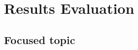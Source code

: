 \documentclass{report}
\begin{document}





\chapter{Results Evaluation} \label{Results Evaluation}  %

\section{Focused topic} \label{Focused topic}
\end{document}
